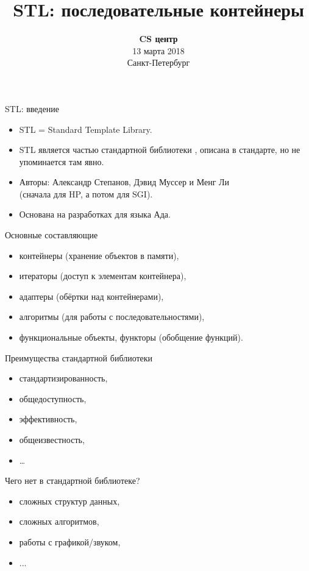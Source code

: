 \documentclass{beamer}
\title{STL: последовательные контейнеры}
\date{
   \textbf{CS центр}\\
   13 марта 2018 \\
   Санкт-Петербург
}
\begin{document}
\begin{frame} 
  \titlepage
\end{frame}

\begin{frame}{STL: введение}
    \begin{itemize}
        \item STL = Standard Template Library.
        
        \item STL является частью стандартной библиотеки \langcpp, описана в стандарте, но не упоминается там явно.
            
        \item Авторы: Александр Степанов, Дэвид Муссер и Менг Ли\\ 
            (сначала для HP, а потом для SGI).

        \item Основана на разработках для языка Ада.
    \end{itemize}
\pause
\begin{block}{Основные составляющие}
    \begin{itemize}
        \item контейнеры (хранение объектов в памяти),
        \item итераторы (доступ к элементам контейнера),
        \item адаптеры (обёртки над контейнерами),
        \item алгоритмы (для работы с последовательностями),
        \item функциональные объекты, функторы (обобщение функций).
    \end{itemize}
\end{block}
\end{frame}

\begin{frame}{Преимущества стандартной библиотеки}{}
    \begin{itemize}
        \item стандартизированность,
        \item общедоступность,
        \item эффективность,
        \item общеизвестность,
        \item \dots
    \end{itemize}
\pause
\begin{block}{Чего нет в стандартной библиотеке?}
    \begin{itemize}
        \item сложных структур данных,
        \item сложных алгоритмов,
        \item работы с графикой/звуком,
        \item ...
    \end{itemize}
\end{block}
\end{frame}
\end{document}
